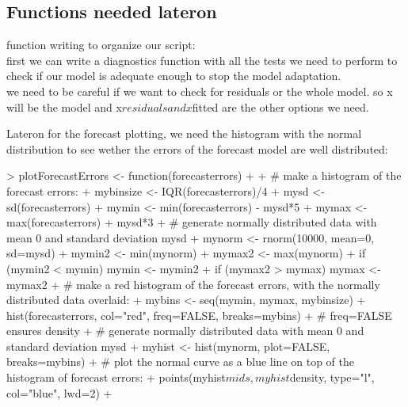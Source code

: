 \documentclass[11pt, a4paper]{article} %
\begin{document}
\subsection{Functions needed lateron}
function writing to organize our script:\\
\noindent first we can write a diagnostics function with all the tests we need to perform to check if our model is adequate enough to stop the model adaptation.\\
we need to be careful if we want to check for residuals or the whole model.
so x will be the model and x$residuals and x$fitted are the other options we need.\\
\begin{Schunk}
\end{Schunk}
\noindent Lateron for the forecast plotting, we need the histogram with the normal distribution to see wether the errors of the forecast model are well distributed:
\begin{Schunk}
\begin{Sinput}
> plotForecastErrors <- function(forecasterrors)
+ {
+ # make a histogram of the forecast errors:
+ mybinsize <- IQR(forecasterrors)/4
+ mysd <- sd(forecasterrors)
+ mymin <- min(forecasterrors) - mysd*5
+ mymax <- max(forecasterrors) + mysd*3
+ # generate normally distributed data with mean 0 and standard deviation mysd
+ mynorm <- rnorm(10000, mean=0, sd=mysd)
+ mymin2 <- min(mynorm)
+ mymax2 <- max(mynorm)
+ if (mymin2 < mymin) { mymin <- mymin2 }
+ if (mymax2 > mymax) { mymax <- mymax2 }
+ # make a red histogram of the forecast errors, with the normally distributed data overlaid:
+ mybins <- seq(mymin, mymax, mybinsize)
+ hist(forecasterrors, col="red", freq=FALSE, breaks=mybins)
+ # freq=FALSE ensures density
+ # generate normally distributed data with mean 0 and standard deviation mysd
+ myhist <- hist(mynorm, plot=FALSE, breaks=mybins)
+ # plot the normal curve as a blue line on top of the histogram of forecast errors:
+ points(myhist$mids, myhist$density, type="l", col="blue", lwd=2)
+ }
\end{Sinput}
\end{Schunk}
\end{document}
